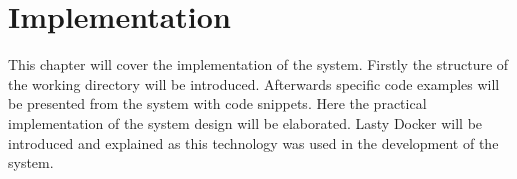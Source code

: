 \chapter{Implementation}
This chapter will cover the implementation of the system.
Firstly the structure of the working directory will be introduced.
Afterwards specific code examples will be presented from the system with code snippets.
Here the practical implementation of the system design will be elaborated.
Lasty Docker will be introduced and explained as this technology was used in the development of the system.



